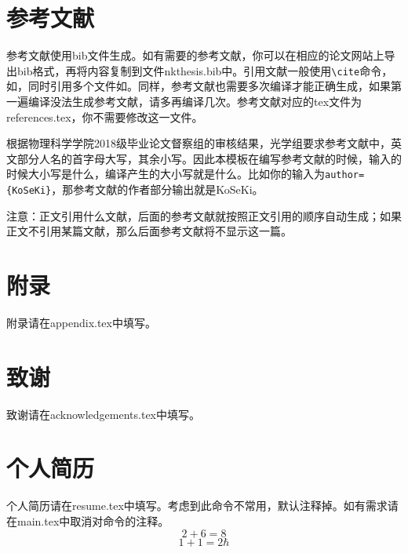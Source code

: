 \section{参考文献}
参考文献使用bib文件生成。如有需要的参考文献，你可以在相应的论文网站上导出bib格式，再将内容复制到文件nkthesis.bib中。引用文献一般使用\verb|\cite|命令，如\cite{zhaoliu}，同时引用多个文件如\cite{zhaoliu,sunqian,chenjing,wuqiang}。同样，参考文献也需要多次编译才能正确生成，如果第一遍编译没法生成参考文献，请多再编译几次。参考文献对应的tex文件为references.tex，你不需要修改这一文件。

根据物理科学学院2018级毕业论文督察组的审核结果，光学组要求参考文献中，英文部分人名的首字母大写，其余小写。因此本模板在编写参考文献的时候，输入的时候大小写是什么，编译产生的大小写就是什么。比如你的输入为\verb|author={KoSeKi}|，那参考文献的作者部分输出就是KoSeKi。

注意：正文引用什么文献，后面的参考文献就按照正文引用的顺序自动生成；如果正文不引用某篇文献，那么后面参考文献将不显示这一篇。
\section{附录}
附录请在appendix.tex中填写。
\section{致谢}
致谢请在acknowledgements.tex中填写。
\section{个人简历}
个人简历请在resume.tex中填写。考虑到此命令不常用，默认注释掉。如有需求请在main.tex中取消对\verb||命令的注释。
\begin{equation}
	2+6=8
\end{equation}
\begin{equation}
	1+1=2\hbar
\end{equation}